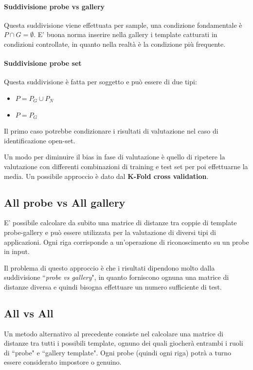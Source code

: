 \documentclass{article}
\begin{document}
\paragraph{Suddivisione probe vs gallery}
Questa suddivisione viene effettuata per sample, una condizione fondamentale è $P \cap G = \emptyset$.
E' buona norma inserire nella gallery i template catturati in condizioni controllate, in quanto nella realtà è la condizione più frequente.

\paragraph{Suddivisione probe set} Questa suddivisione è fatta per soggetto e può essere di due tipi:
\begin{itemize}
    \item $P = P_G \cup P_N$
    \item $P = P_G$
\end{itemize}
Il primo caso potrebbe condizionare i risultati di valutazione nel caso di identificazione open-set.

\bigskip
Un modo per diminuire il bias in fase di valutazione è quello di ripetere la valutazione con differenti combinazioni di training e test set per poi effettuarne la media. Un possibile approccio è dato dal \textbf{K-Fold cross validation}.

\subsection{All probe vs All gallery}
E' possibile calcolare da subito una matrice di distanze tra coppie di template probe-gallery e può essere utilizzata per la valutazione di diversi tipi di applicazioni. Ogni riga corrisponde a un'operazione di riconoscimento su un probe in input.

\bigskip 
Il problema di questo approccio è che i risultati dipendono molto dalla suddivisione ``\textit{probe vs gallery}", in quanto forniscono ognuna una matrice di distanze diversa e quindi bisogna effettuare un numero sufficiente di test.

\subsection{All vs All}
Un metodo alternativo al precedente consiste nel calcolare una matrice di distanze tra tutti i possibili template, ognuno dei quali giocherà entrambi i ruoli di ``probe" e ``gallery template". Ogni probe (quindi ogni riga) potrà a turno essere considerato impostore o genuino.
\end{document}
